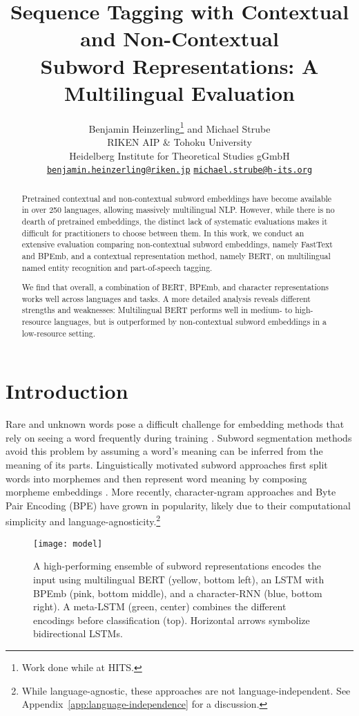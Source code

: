 \documentclass[11pt,a4paper]{article}
\title{Sequence Tagging with Contextual and Non-Contextual \\
	Subword Representations: A Multilingual Evaluation}
\author{Benjamin Heinzerling\textsuperscript{\textnormal{}}\thanks{\hspace{0.4em} Work done while at HITS.} \hspace{0.18em} \textnormal{and}\hspace{0.09em} Michael Strube\textsuperscript{\textnormal{}}\\
\vspace{0.1ex}
  \textsuperscript{\textnormal{}}RIKEN AIP \& Tohoku University \\
\vspace{0.1ex}
  \textsuperscript{\textnormal{}}Heidelberg Institute for Theoretical Studies gGmbH \\
\vspace{0.1ex}
  \hypersetup{urlcolor=black}\href{mailto:benjamin.heinzerling@riken.jp}{\tt benjamin.heinzerling@riken.jp} \hspace{0.06em}  \hspace{0.12em} \hypersetup{urlcolor=black}\href{mailto:michael.strube@h-its.org}{\tt michael.strube@h-its.org} \\
}
\date{}
\begin{document}
\maketitle
\begin{abstract}
Pretrained contextual and non-contextual subword embeddings have become available in over 250 languages, allowing massively multilingual NLP.
However, while there is no dearth of pretrained embeddings, the distinct lack of systematic evaluations makes it difficult for practitioners to choose between them.
In this work, we conduct an extensive evaluation comparing non-contextual subword embeddings, namely FastText and BPEmb, and a contextual representation method, namely BERT, on multilingual named entity recognition and part-of-speech tagging.

We find that overall, a combination of BERT, BPEmb, and character representations works well across languages and tasks.
A more detailed analysis reveals different strengths and weaknesses: Multilingual BERT performs well in medium- to high-resource languages, but is outperformed by non-contextual subword embeddings in a low-resource setting.

\end{abstract}

\section{Introduction}

Rare and unknown words pose a difficult challenge for embedding methods that rely on seeing a word frequently during training \citep{bullinaria2007extracting,luong2013word}.
Subword segmentation methods avoid this problem by assuming a word's meaning can be inferred from the meaning of its parts.
Linguistically motivated subword approaches first split words into morphemes and then represent word meaning by composing morpheme embeddings \citep{luong2013word}.
More recently, character-ngram approaches \citep{luong2016open,bojanowski2017subword} and Byte Pair Encoding (BPE) \citep{sennrich2016subword} have grown in popularity, likely due to their computational simplicity and language-agnosticity.\footnote{While language-agnostic, these approaches are not language-independent. See Appendix~\ref{app:language-independence} for a discussion.}

\begin{figure}[t!]
	\centering
	\texttt{[image: model]}
	\caption{A high-performing ensemble of subword representations encodes the input using multilingual BERT (yellow, bottom left), an LSTM with BPEmb (pink, bottom middle), and a character-RNN (blue, bottom right). A meta-LSTM (green, center) combines the different encodings before classification (top). Horizontal arrows symbolize bidirectional LSTMs.}
	\label{fig:model}
\end{figure}
\end{document}
